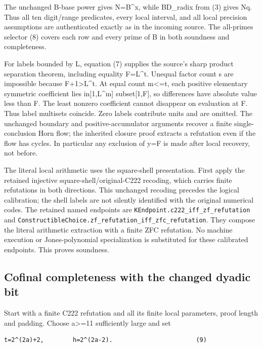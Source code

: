 The unchanged B-base power gives N=B\^{}x, while B\textbar D\_radix from
(3) gives N\textbar q. Thus all ten digit/range predicates, every local
interval, and all local precision assumptions are authenticated exactly
as in the incoming source. The all-primes selector (8) covers each row
and every prime of B in both soundness and completeness.

For labels bounded by L, equation (7) supplies the source's sharp
product separation theorem, including equality F=L\^{}t. Unequal factor
count s are impossible because F+1\textgreater L\^{}t. At equal count
m\textless=t, each positive elementary symmetric coefficient lies
in{[}1,L\^{}m{]} subset{[}1,F{]}, so differences have absolute value
less than F. The least nonzero coefficient cannot disappear on
evaluation at F. Thus label multisets coincide. Zero labels contribute
units and are omitted. The unchanged boundary and positive-accumulator
arguments recover a finite single-conclusion Horn flow; the inherited
closure proof extracts a refutation even if the flow has cycles. In
particular any exclusion of y=F is made after local recovery, not
before.

The literal local arithmetic uses the square-shell presentation. First
apply the retained injective square-shell/original-C222 recoding, which
carries finite refutations in both directions. This unchanged recoding
precedes the logical calibration; the shell labels are not silently
identified with the original numerical codes. The retained named
endpoints are \nolinkurl{KEndpoint.c222_iff_zf_refutation} and
\nolinkurl{ConstructibleChoice.zf_refutation_iff_zfc_refutation}. They
compose the literal arithmetic extraction with a finite ZFC refutation.
No machine execution or Jones-polynomial specialization is substituted
for these calibrated endpoints. This proves soundness.

\subsection{Cofinal completeness with the changed dyadic
bit}\label{cofinal-completeness-with-the-changed-dyadic-bit}

Start with a finite C222 refutation and all its finite local parameters,
proof length and padding. Choose a\textgreater=11 sufficiently large and
set

\begin{verbatim}
t=2^(2a)+2,        h=2^(2a-2).                       (9)
\end{verbatim}

